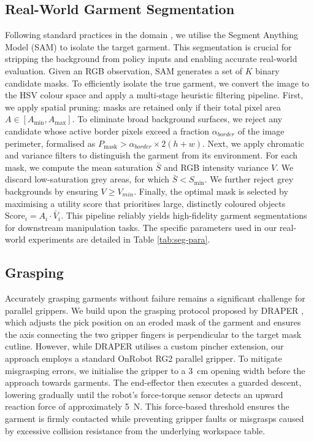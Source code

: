 \documentclass[journal]{IEEEtran}
\newif\ifshowrev\showrevtrue
\newcommand{\rev}[1]{\ifshowrev\textcolor{revblue}{#1}\else#1\fi}
\begin{document}
\subsection{Real-World Garment Segmentation} \label{sec:real-world-cloth-seg}
Following standard practices in the domain \cite{canberk2023cloth, lin2022learning, kadi2025draper}, we utilise the Segment Anything Model (SAM) \cite{kirillov2023segment} to isolate the target garment. This segmentation is crucial for stripping the background from policy inputs and enabling accurate real-world evaluation. Given an RGB observation, SAM generates a set of $K$ binary candidate masks. To efficiently isolate the true garment, we convert the image to the HSV colour space and apply a multi-stage heuristic filtering pipeline. First, we apply spatial pruning: masks are retained only if their total pixel area $A \in [A_{\text{min}}, A_{\text{max}}]$. To eliminate broad background surfaces, we reject any candidate whose active border pixels exceed a fraction $\alpha_{border}$ of the image perimeter, formalised as $P_{\text{mask}} > \alpha_{border} \times 2(h + w)$. Next, we apply chromatic and variance filters to distinguish the garment from its environment. For each mask, we compute the mean saturation $\bar{S}$ and RGB intensity variance $V$. \rev{We discard low-saturation grey areas, for which $\bar{S} < S_{\text{min}}$.} We further reject grey backgrounds by ensuring $ V \geq V_{min}$. Finally, the optimal mask is selected by maximising a utility score that prioritises large, distinctly coloured objects $\text{Score}_i = A_i \cdot \bar{V}_i$. This pipeline reliably yields high-fidelity garment segmentations for downstream manipulation tasks. The specific parameters used in our real-world experiments are detailed in Table \ref{tab:seg-para}.
\subsection{Grasping} \label{sec:grasping}

Accurately grasping garments without failure remains a significant challenge for parallel grippers. We build upon the grasping protocol proposed by DRAPER \cite{kadi2025draper}, which adjusts the pick position on an eroded mask of the garment and ensures the axis connecting the two gripper fingers is perpendicular to the target mask cutline. However, while DRAPER utilises a custom pincher extension, our approach employs a standard OnRobot RG2 parallel gripper. To mitigate misgrasping errors, we initialise the gripper to a 3~cm opening width before the approach towards garments. The end-effector then executes a guarded descent, lowering gradually until the robot's force-torque sensor detects an upward reaction force of approximately 5~N. This force-based threshold ensures the garment is firmly contacted while preventing gripper faults or misgrasps caused by excessive collision resistance from the underlying workspace table.

\renewcommand{\refname}{Appendix References}

\end{document}
